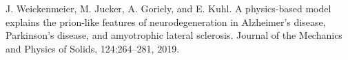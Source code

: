 \documentclass[12pt, letterpaper]{article}
\begin{document}

\begin{thebibliography}{9}
    J. Weickenmeier, M. Jucker, A. Goriely, and E. Kuhl. A physics-based model explains the prion-like features of neurodegeneration in Alzheimer’s disease, Parkinson’s disease, and amyotrophic lateral sclerosis. Journal of the Mechanics and
    Physics of Solids, 124:264–281, 2019.
\end{thebibliography}
\end{document}
